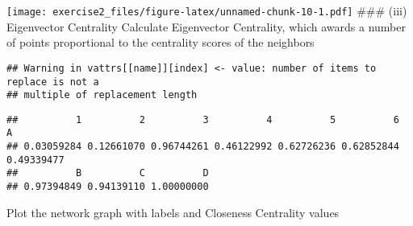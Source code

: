 \documentclass[
]{article}
\newenvironment{Shaded}{\begin{snugshade}}{\end{snugshade}}
\newcommand{\DecValTok}[1]{\textcolor[rgb]{0.00,0.00,0.81}{#1}}
\newcommand{\FunctionTok}[1]{\textcolor[rgb]{0.00,0.00,0.00}{#1}}
\newcommand{\NormalTok}[1]{#1}
\newcommand{\OtherTok}[1]{\textcolor[rgb]{0.56,0.35,0.01}{#1}}
\newcommand{\SpecialCharTok}[1]{\textcolor[rgb]{0.00,0.00,0.00}{#1}}
\begin{document}
\texttt{[image: exercise2\_files/figure-latex/unnamed-chunk-10-1.pdf]}
\#\#\# (iii) Eigenvector Centrality Calculate Eigenvector Centrality,
which awards a number of points proportional to the centrality scores of
the neighbors

\begin{Shaded}
\end{Shaded}

\begin{verbatim}
## Warning in vattrs[[name]][index] <- value: number of items to replace is not a
## multiple of replacement length
\end{verbatim}

\begin{Shaded}
\end{Shaded}

\begin{verbatim}
##          1          2          3          4          5          6          A 
## 0.03059284 0.12661070 0.96744261 0.46122992 0.62726236 0.62852844 0.49339477 
##          B          C          D 
## 0.97394849 0.94139110 1.00000000
\end{verbatim}

Plot the network graph with labels and Closeness Centrality values
\end{document}
